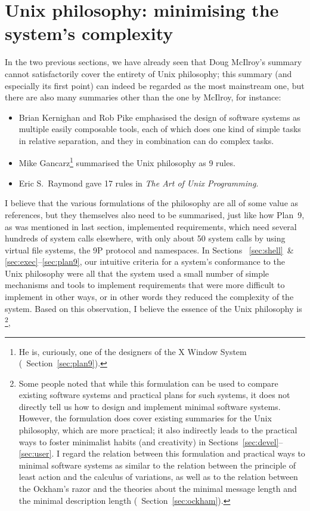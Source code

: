 \section{Unix philosophy: minimising the system's complexity}\label{sec:complex}

In the two previous sections, we have already seen that Doug McIlroy's
summary cannot satisfactorily cover the entirety of Unix philosophy;
this summary (and especially its first point) can indeed be regarded as
the most mainstream one, but there are also many summaries other than
the one by McIlroy, for instance:
\begin{itemize}
\item Brian Kernighan and Rob Pike emphasised the design of software systems as
	multiple easily composable tools, each of which does one kind of simple
	tasks in relative separation, and they in combination can do complex tasks.
\item Mike Gancarz\footnote{He is, curiously, one of the designers of the
	X Window System (\cf~Section~\ref{sec:plan9}).} summarised
	the Unix philosophy as 9 rules.
\item Eric S.\ Raymond gave 17 rules in \emph{The Art of Unix Programming}.
\end{itemize}
I believe that the various formulations of the philosophy are all of some value
as references, but they themselves also need to be summarised, just like how
Plan~9, as was mentioned in last section, implemented requirements, which need
several hundreds of system calls elsewhere, with only about 50 system calls
by using virtual file systems, the 9P protocol and namespaces.  In Sections~%
\ref{sec:shell}~\& \ref{sec:exec}--\ref{sec:plan9}, our intuitive criteria
for a system's conformance to the Unix philosophy were all that the system
used a small number of simple mechanisms and tools to implement requirements
that were more difficult to implement in other ways, or in other words they
reduced the complexity of the system.  Based on this observation, I believe
the essence of the Unix philosophy is \footnote%
{Some people noted that while this formulation can be used to compare existing
software systems and practical plans for such systems, it does not directly
tell us how to design and implement minimal software systems.  However, the
formulation does cover existing summaries for the Unix philosophy, which
are more practical; it also indirectly leads to the practical ways to foster
minimalist habits (and creativity) in Sections~\ref{sec:devel}--\ref{sec:user}.
I regard the relation between this formulation and practical ways to minimal
software systems as similar to the relation between the principle of least
action and the calculus of variations, as well as to the relation between
the Ockham's razor and the theories about the minimal message length
and the minimal description length (\cf~Section~\ref{sec:ockham}).},
